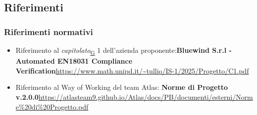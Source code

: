 \documentclass[a4paper,12pt]{article}
\begin{document}
    \subsection{Riferimenti}
        \subsubsection{Riferimenti normativi}
            \begin{itemize}
                \item Riferimento al \textit{capitolato}\textsubscript{\href{https://atlasteam9.github.io/Atlas/glossario.html\#Capitolato}{G}} 1 dell'azienda proponente:\newline \textbf{Bluewind S.r.l - Automated EN18031 Compliance Verification}\newline \url{https://www.math.unipd.it/~tullio/IS-1/2025/Progetto/C1.pdf}
                \item Riferimento al Way of Working del team Atlas: \newline \textbf{Norme di Progetto v.2.0.0}\newline \url{https://atlasteam9.github.io/Atlas/docs/PB/documenti/esterni/Norme%20di%20Progetto.pdf}
            \end{itemize}
        
\end{document}
